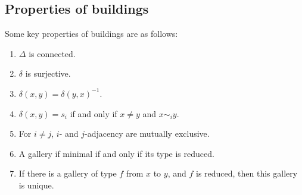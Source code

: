 \documentclass[11pt]{article}
\begin{document}
\subsection{Properties of buildings}
Some key properties of buildings are as follows:
\begin{enumerate}
    \item $\Delta$ is connected.
    \item $\delta$ is surjective.
    \item $\delta(x,y)=\delta(y,x)^{-1}$.
    \item $\delta(x,y)=s_i$ if and only if $x\neq y$ and $x\sim_i y$.
    \item For $i\neq j$, $i$- and $j$-adjacency are mutually exclusive.
    \item A gallery if minimal if and only if its type is reduced.
    \item If there is a gallery of type $f$ from $x$ to $y$, and $f$ is reduced, then this gallery is unique.
\end{enumerate}






\end{document}
